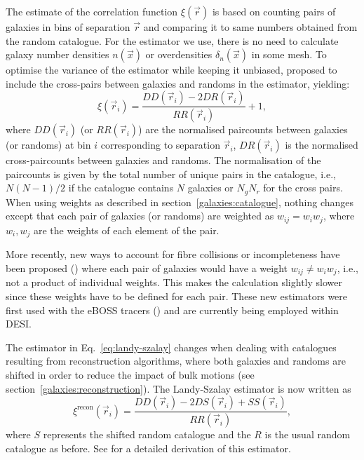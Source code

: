 The estimate of the correlation function $\xi(\vec{r})$ is based on counting pairs of galaxies 
in bins of separation $\vec{r}$ and comparing it to same numbers obtained from the random catalogue. 
For the estimator we use, there is no need to calculate galaxy number densities $n(\vec{x})$  
or overdensities $\delta_n(\vec{x})$ in some mesh. To optimise the variance of the estimator 
while keeping it unbiased, \cite{landyBiasVarianceAngular1993} proposed to include the cross-pairs  
between galaxies and randoms in the estimator, yielding:
\begin{equation}
 \xi(\vec{r}_i) = \frac{DD(\vec{r}_i) - 2DR(\vec{r}_i)}{RR(\vec{r}_i)} + 1,
 \label{eq:landy-szalay}
\end{equation}
where $DD(\vec{r}_i)$ (or $RR(\vec{r}_i)$) are the normalised paircounts between galaxies (or randoms) 
at bin $i$ corresponding to separation $\vec{r}_i$, 
$DR(\vec{r}_i)$ is the normalised cross-paircounts between galaxies and randoms. 
The normalisation of the paircounts is given by the total number of unique pairs in the catalogue, 
i.e., $N(N-1)/2$ if the catalogue contains $N$ galaxies or $N_g N_r$ for the cross pairs. 
When using weights as described in section~\ref{galaxies:catalogue}, nothing changes except 
that each pair of galaxies (or randoms) are weighted as $w_{ij} = w_i w_j$, where $w_i, w_j$ are the 
weights of each element of the pair. 

More recently, new ways to account for fibre collisions 
or incompleteness have been proposed 
(\cite{bianchiUnbiasedClusteringEstimation2017, percivalUsingAngularPair2017}) where each pair 
of galaxies would have a weight $w_{ij} \neq w_i w_j$, i.e., not a product of individual weights. 
This makes the calculation slightly slower since these weights have to be defined for each pair. 
These new estimators were first used with the eBOSS tracers
(\cite{mohammadCompletedSDSSIVExtended2020}) and are currently being employed within DESI. 

The estimator in Eq.~\ref{eq:landy-szalay} changes when dealing with catalogues 
resulting from reconstruction algorithms,
where both galaxies and randoms are shifted in order to reduce the impact of bulk motions 
(see section~\ref{galaxies:reconstruction}). 
The Landy-Szalay estimator is now written as  
\begin{equation}
    \xi^\text{recon}(\vec{r}_i) = \frac{DD(\vec{r}_i) - 2DS(\vec{r}_i) + SS(\vec{r}_i)}{RR(\vec{r}_i)},
    \label{eq:landy-szalay-recon}
\end{equation}
where $S$ represents the shifted random catalogue and the $R$ is the usual random catalogue as before. 
See \cite{padmanabhanReconstructingBaryonOscillations2009, padmanabhanCentDistance352012} 
for a detailed derivation of this estimator. 

